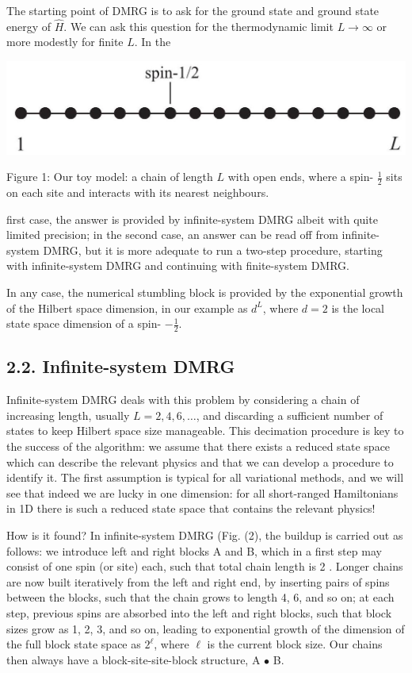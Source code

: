 \documentclass[12pt]{article}
\begin{document}
The starting point of DMRG is to ask for the ground state and ground state energy of $\hat{H}$. We can ask this question for the thermodynamic limit $L \rightarrow \infty$ or more modestly for finite $L$. In the

\begin{center}
\includegraphics[max width=\textwidth]{2024_05_04_afc4ad226da9ccfe0ac8g-007}
\end{center}

Figure 1: Our toy model: a chain of length $L$ with open ends, where a spin- $\frac{1}{2}$ sits on each site and interacts with its nearest neighbours.

first case, the answer is provided by infinite-system DMRG albeit with quite limited precision; in the second case, an answer can be read off from infinite-system DMRG, but it is more adequate to run a two-step procedure, starting with infinite-system DMRG and continuing with finite-system DMRG.

In any case, the numerical stumbling block is provided by the exponential growth of the Hilbert space dimension, in our example as $d^{L}$, where $d=2$ is the local state space dimension of a spin- $-\frac{1}{2}$.

\subsection*{2.2. Infinite-system DMRG}
Infinite-system DMRG deals with this problem by considering a chain of increasing length, usually $L=2,4,6, \ldots$, and discarding a sufficient number of states to keep Hilbert space size manageable. This decimation procedure is key to the success of the algorithm: we assume that there exists a reduced state space which can describe the relevant physics and that we can develop a procedure to identify it. The first assumption is typical for all variational methods, and we will see that indeed we are lucky in one dimension: for all short-ranged Hamiltonians in 1D there is such a reduced state space that contains the relevant physics!

How is it found? In infinite-system DMRG (Fig. (2), the buildup is carried out as follows: we introduce left and right blocks A and B, which in a first step may consist of one spin (or site) each, such that total chain length is 2 . Longer chains are now built iteratively from the left and right end, by inserting pairs of spins between the blocks, such that the chain grows to length 4, 6, and so on; at each step, previous spins are absorbed into the left and right blocks, such that block sizes grow as 1, 2, 3, and so on, leading to exponential growth of the dimension of the full block state space as $2^{\ell}$, where $\ell$ is the current block size. Our chains then always have a block-site-site-block structure, A $\bullet$ B.
\end{document}
